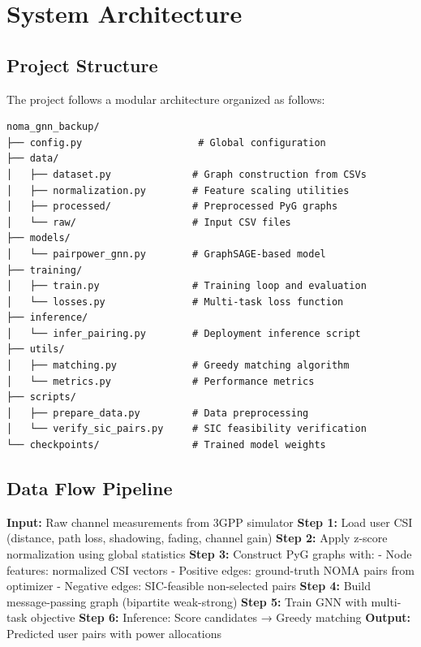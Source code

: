 \documentclass[12pt,a4paper]{article}
\begin{document}
\section{System Architecture}

\subsection{Project Structure}
The project follows a modular architecture organized as follows:

\begin{tcolorbox}[title=Directory Structure]
\begin{verbatim}
noma_gnn_backup/
├── config.py                    # Global configuration
├── data/
│   ├── dataset.py              # Graph construction from CSVs
│   ├── normalization.py        # Feature scaling utilities
│   ├── processed/              # Preprocessed PyG graphs
│   └── raw/                    # Input CSV files
├── models/
│   └── pairpower_gnn.py        # GraphSAGE-based model
├── training/
│   ├── train.py                # Training loop and evaluation
│   └── losses.py               # Multi-task loss function
├── inference/
│   └── infer_pairing.py        # Deployment inference script
├── utils/
│   ├── matching.py             # Greedy matching algorithm
│   └── metrics.py              # Performance metrics
├── scripts/
│   ├── prepare_data.py         # Data preprocessing
│   └── verify_sic_pairs.py     # SIC feasibility verification
└── checkpoints/                # Trained model weights
\end{verbatim}
\end{tcolorbox}

\subsection{Data Flow Pipeline}

\begin{algorithm}[H]
\caption{NOMA-GNN Processing Pipeline}
\begin{algorithmic}[1]
\State \textbf{Input:} Raw channel measurements from 3GPP simulator
\State \textbf{Step 1:} Load user CSI (distance, path loss, shadowing, fading, channel gain)
\State \textbf{Step 2:} Apply z-score normalization using global statistics
\State \textbf{Step 3:} Construct PyG graphs with:
    \State \quad - Node features: normalized CSI vectors
    \State \quad - Positive edges: ground-truth NOMA pairs from optimizer
    \State \quad - Negative edges: SIC-feasible non-selected pairs
\State \textbf{Step 4:} Build message-passing graph (bipartite weak-strong)
\State \textbf{Step 5:} Train GNN with multi-task objective
\State \textbf{Step 6:} Inference: Score candidates → Greedy matching
\State \textbf{Output:} Predicted user pairs with power allocations
\end{algorithmic}
\end{algorithm}
\end{document}
